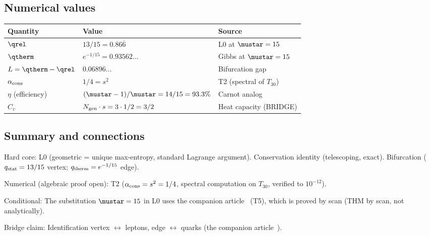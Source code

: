 \documentclass[12pt,a4paper]{article}
\begin{document}
\subsection{Numerical values}
\label{sec:ch3_numerics}

\begin{center}
\begin{tabular}{lll}
\toprule
\textbf{Quantity} & \textbf{Value} & \textbf{Source} \\
\midrule
$\qrel$ & $13/15 = 0.86\overline{6}$ & L0 at $\mustar = 15$ \\
$\qtherm$ & $e^{-1/15} = 0.93562\ldots$ & Gibbs at $\mustar = 15$ \\
$L = \qtherm - \qrel$ & $0.06896\ldots$ & Bifurcation gap \\
$\alpha_{\rm cons}$ & $1/4 = s^2$ & T2 (spectral of $T_{30}$) \\
$\eta$ (efficiency) & $(\mustar - 1)/\mustar = 14/15 = 93.3\%$ & Carnot analog \\
$C_v$ & $N_{\rm gen} \cdot s = 3 \cdot 1/2 = 3/2$ & Heat capacity (BRIDGE) \\
\bottomrule
\end{tabular}
\end{center}

\subsection{Summary and connections}
\label{sec:ch3_summary}

\begin{ledgerbox}
Hard core:
  L0 (geometric = unique max-entropy, standard Lagrange argument).
  Conservation identity (telescoping, exact).
  Bifurcation ($q_{\rm stat} = 13/15$ vertex; $q_{\rm therm} = e^{-1/15}$ edge).

Numerical (algebraic proof open):
  T2 ($\alpha_{\rm cons} = s^2 = 1/4$, spectral computation on $T_{30}$,
  verified to $10^{-12}$).

Conditional:
  The substitution $\mustar = 15$ in L0 uses the companion article~\cite{companion_M3} (T5), which is
  proved by scan (THM by scan, not analytically).

Bridge claim:
  Identification vertex $\leftrightarrow$ leptons, edge $\leftrightarrow$ quarks (the companion article~\cite{companion_M5}).
\end{ledgerbox}
\end{document}
